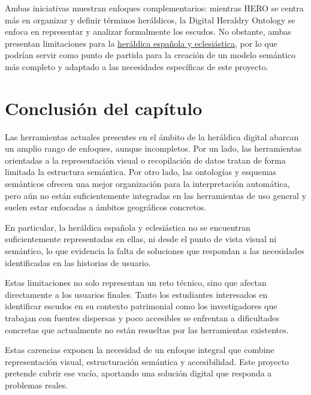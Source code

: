 Ambas iniciativas muestran enfoques complementarios: mientras HERO se centra más en organizar y
definir términos heráldicos, la Digital Heraldry Ontology se enfoca en representar y analizar
formalmente los escudos. No obstante, ambas presentan limitaciones para la \hyperref[sec:heraldica]{heráldica española y
eclesiástica}, por lo que podrían servir como punto de partida para la creación de un modelo semántico
más completo y adaptado a las necesidades específicas de este proyecto.

\section{Conclusión del capítulo}
Las herramientas actuales presentes en el ámbito de la heráldica digital abarcan un amplio
rango de enfoques, aunque incompletos. Por un lado, las herramientas orientadas a la representación
visual o recopilación de datos tratan de forma limitada la estructura semántica. Por otro lado,
las ontologías y esquemas semánticos ofrecen una mejor organización para la interpretación
automática, pero aún no están suficientemente integradas en las herramientas de uso general y
suelen estar enfocadas a ámbitos geográficos concretos. 

En particular, la heráldica española y eclesiástica no se encuentran suficientemente representadas 
en ellas, ni desde el punto de vista visual ni semántico, lo que evidencia la falta de soluciones 
que respondan a las necesidades identificadas en las historias de usuario.

Estas limitaciones no solo representan un reto técnico, sino que afectan directamente a los 
usuarios finales. Tanto los estudiantes interesados en identificar escudos en su contexto patrimonial 
como los investigadores que trabajan con fuentes dispersas y poco accesibles se enfrentan a 
dificultades concretas que actualmente no están resueltas por las herramientas existentes.

Estas carencias exponen la necesidad de un enfoque integral que combine representación
visual, estructuración semántica y accesibilidad. Este proyecto pretende cubrir ese vacío,
aportando una solución digital que responda a problemas reales.